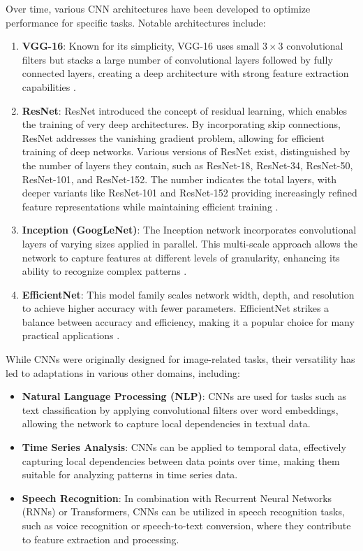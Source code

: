 Over time, various CNN architectures have been developed to optimize performance for specific tasks. Notable architectures include:
\begin{enumerate}
    \item \textbf{VGG-16}: Known for its simplicity, VGG-16 uses small \(3 \times 3\) convolutional filters but stacks a large number of convolutional layers followed by fully connected layers, creating a deep architecture with strong feature extraction capabilities \cite{7486599}.

    \item \textbf{ResNet}: ResNet introduced the concept of residual learning, which enables the training of very deep architectures. By incorporating skip connections, ResNet addresses the vanishing gradient problem, allowing for efficient training of deep networks. Various versions of ResNet exist, distinguished by the number of layers they contain, such as ResNet-18, ResNet-34, ResNet-50, ResNet-101, and ResNet-152. The number indicates the total layers, with deeper variants like ResNet-101 and ResNet-152 providing increasingly refined feature representations while maintaining efficient training \cite{DBLP:journals/corr/HeZRS15, 10197463}.

    \item \textbf{Inception (GoogLeNet)}: The Inception network incorporates convolutional layers of varying sizes applied in parallel. This multi-scale approach allows the network to capture features at different levels of granularity, enhancing its ability to recognize complex patterns \cite{DBLP:journals/corr/SzegedyLJSRAEVR14}.

    \item \textbf{EfficientNet}: This model family scales network width, depth, and resolution to achieve higher accuracy with fewer parameters. EfficientNet strikes a balance between accuracy and efficiency, making it a popular choice for many practical applications \cite{DBLP:journals/corr/abs-1905-11946}.
\end{enumerate}

While CNNs were originally designed for image-related tasks, their versatility has led to adaptations in various other domains, including:
\begin{itemize}
    \item \textbf{Natural Language Processing (NLP)}: CNNs are used for tasks such as text classification by applying convolutional filters over word embeddings, allowing the network to capture local dependencies in textual data.

    \item \textbf{Time Series Analysis}: CNNs can be applied to temporal data, effectively capturing local dependencies between data points over time, making them suitable for analyzing patterns in time series data.

    \item \textbf{Speech Recognition}: In combination with Recurrent Neural Networks (RNNs) or Transformers, CNNs can be utilized in speech recognition tasks, such as voice recognition or speech-to-text conversion, where they contribute to feature extraction and processing.
\end{itemize}

